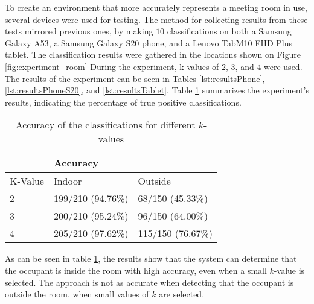 To create an environment that more accurately represents a meeting room in use, several devices were used for testing. 
The method for collecting results from these tests mirrored previous ones, by making $10$ classifications on both a Samsung Galaxy A53, a Samsung Galaxy S20 phone, and a Lenovo TabM10 FHD Plus tablet. 
The classification results were gathered in the locations shown on Figure \ref{fig:experiment_room}
During the experiment, k-values of $2$, $3$, and $4$ were used.  
The results of the experiment can be seen in Tables \ref{lst:resultsPhone}, \ref{lst:resultsPhoneS20}, and  \ref{lst:resultsTablet}.
Table \ref{lst:resultsPhone_precision} summarizes the experiment's results, indicating the percentage of true positive classifications. 

\begin{table}[H]
    \centering
    \begin{tabular}{|l|ll|}
    \hline
            & \multicolumn{2}{l|}{Accuracy}                      \\ \hline
    K-Value & \multicolumn{1}{l|}{Indoor}          & Outside      \\ \hline
    2       & \multicolumn{1}{l|}{199/210 (94.76\%)} & 68/150 (45.33\%) \\ \hline
    3       & \multicolumn{1}{l|}{200/210 (95.24\%)} & 96/150 (64.00\%) \\ \hline
    4       & \multicolumn{1}{l|}{205/210 (97.62\%)} & 115/150 (76.67\%) \\ \hline   
    \end{tabular}
    \caption{Accuracy of the classifications for different $k$-values}
    \label{lst:resultsPhone_precision}
\end{table}
As can be seen in table \ref{lst:resultsPhone_precision}, the results show that the system can determine that the occupant is inside the room with high accuracy, even when a small $k$-value is selected. The approach is not as accurate when detecting that the occupant is outside the room, when small values of $k$ are selected.  